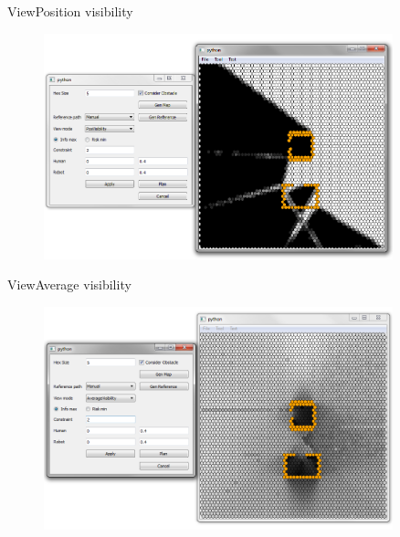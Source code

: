 \begin{frame}{View}{Position visibility}

\begin{figure}
\centering
\includegraphics[width = 0.9\textwidth]{./screenshot/position_visibility_view2.png}
\end{figure}

\end{frame}

\begin{frame}{View}{Average visibility}

\begin{figure}
\centering
\includegraphics[width = 0.9\textwidth]{./screenshot/average_visibility_view.png}
\end{figure}

\end{frame}

